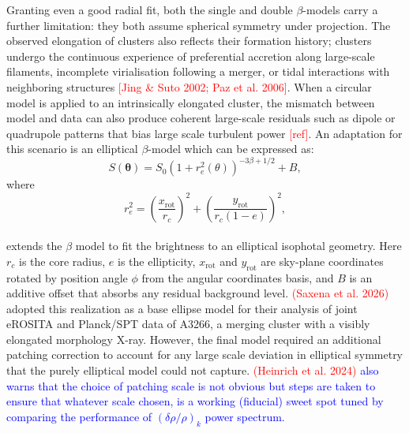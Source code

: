 \pbreak
Granting even a good radial fit, both the single and double $\beta$-models carry a further limitation: they both assume spherical symmetry under projection. The observed elongation of clusters also reflects their formation history; clusters undergo the continuous experience of preferential accretion along large-scale filaments, incomplete virialisation following a merger, or tidal interactions with neighboring structures \textcolor{red}{[Jing \& Suto 2002; Paz et al. 2006]}. When a circular model is applied to an intrinsically elongated cluster, the mismatch between model and data can also produce coherent large-scale residuals such as dipole or quadrupole patterns that bias large scale turbulent power \textcolor{red}{[ref]}. An adaptation for this scenario is an elliptical $\beta$-model which can be expressed as:
%
\begin{equation}
	S(\boldsymbol{\theta}) = S_0 
	\left(1 + r_e^2(\theta)\right)^{-3\beta + 1/2} + B,
	\label{eq:ellipticalBeta}
\end{equation}
%
where
%
\begin{equation}
	r_e^2 = \left(\frac{x_{\mathrm{rot}}}{r_c}\right)^2 + 
	\left(\frac{y_{\mathrm{rot}}}{r_c(1-e)}\right)^2,
	\label{eq:ellipRadius}
\end{equation}
\\
extends the $\beta$ model to fit the brightness to an elliptical isophotal geometry. Here $r_c$ is the core radius, $e$ is the ellipticity, $x_{\mathrm{rot}}$ and $y_{\mathrm{rot}}$ are sky-plane coordinates rotated by position angle $\phi$ from the angular coordinates basis, and $B$ is an additive offset that absorbs any residual background level. \textcolor{red}{(Saxena et al. 2026)} adopted this realization as a base ellipse model for their analysis of joint eROSITA and Planck/SPT data of A3266, a merging cluster with a visibly elongated morphology X-ray. However, the final model required an additional patching correction to account for any large scale deviation in elliptical symmetry that the purely elliptical model could not capture. \textcolor{blue}{\textcolor{red}{(Heinrich et al. 2024)} also warns that the choice of patching scale is not obvious but steps are taken to ensure that whatever scale chosen, is a working (fiducial) sweet spot tuned by comparing the performance of $(\delta \rho/ \rho)_{k}$ power spectrum.}

